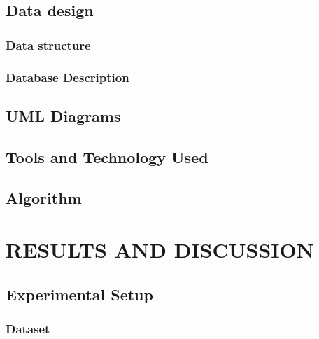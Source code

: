 \documentclass[12pt,a4]{report}
\newcounter{lofmodule}
\newcounter{lofsubmodule}[lofmodule]
\newcounter{lofsubsubmodule}[lofsubmodule]
\renewcommand{\thelofmodule}{\arabic{lofmodule}}
\newcommand{\lofsection}[1]{%
  \refstepcounter{lofmodule}%
  \setcounter{lofsubmodule}{0}%
  \setcounter{lofsubsubmodule}{0}%
  \addtocontents{lof}{\protect\vspace{1em}}%
  \addtocontents{lof}{\protect\noindent \textbf{\thelofmodule.\hspace{1em} #1}\protect\par}%
  \addtocontents{lof}{\protect\vspace{0.5em}}%
}
\begin{document}
\section{Data design}
\subsection{ Data structure}

\subsection{Database Description}

\section{UML Diagrams}
\vspace{0.1cm}

\section{Tools and Technology Used}


\section{Algorithm}

 \chapter{RESULTS AND DISCUSSION}
 \section{Experimental Setup}
 \subsection{Dataset}
\end{document}
